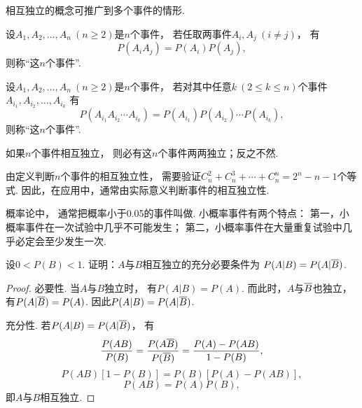 相互独立的概念可推广到多个事件的情形.
\begin{definition}
设\(A_1,A_2,\dotsc,A_n\ (n \geq 2)\)是\(n\)个事件，
若任取两事件\(A_i,A_j\ (i \neq j)\)，
有\begin{equation*}
	P(A_i A_j) = P(A_i) P(A_j),
\end{equation*}
则称“这\(n\)个事件”.
\end{definition}

\begin{definition}
设\(A_1,A_2,\dotsc,A_n\ (n \geq 2)\)是\(n\)个事件，
若对其中任意\(k\ (2 \leq k \leq n)\)个事件\(A_{i_1},A_{i_2},\dotsc,A_{i_k}\)
有\begin{equation*}
	P(A_{i_1} A_{i_2} \dotsm A_{i_k})
	= P(A_{i_1}) P(A_{i_2}) \dotsm P(A_{i_k}),
\end{equation*}
则称“这\(n\)个事件”.
\end{definition}

\begin{theorem}
如果\(n\)个事件相互独立，
则必有这\(n\)个事件两两独立；反之不然.
\end{theorem}

由定义判断\(n\)个事件的相互独立性，
需要验证\(C_n^2+C_n^3+\dotsb+C_n^n=2^n-n-1\)个等式.
因此，在应用中，通常由实际意义判断事件的相互独立性.

概率论中，
通常把概率小于0.05的事件叫做.
小概率事件有两个特点：
第一，小概率事件在一次试验中几乎不可能发生；
第二，小概率事件在大量重复试验中几乎必定会至少发生一次.

\begin{example}
设\(0<P(B)<1\).
证明：\(A\)与\(B\)相互独立的充分必要条件为
\(P(A \vert B) = P(A \vert \SetComplementaryL{B})\).
\begin{proof}
必要性.
当\(A\)与\(B\)独立时，
有\(P(A \vert B) = P(A)\).
而此时，\(A\)与\(\SetComplementaryL{B}\)也独立，
有\(P(A \vert \SetComplementaryL{B}) = P(A)\).
因此\(P(A \vert B) = P(A \vert \SetComplementaryL{B})\).

充分性.
若\(P(A \vert B) = P(A \vert \SetComplementaryL{B})\)，
有\begin{equation*}
	\frac{P(AB)}{P(B)}
	= \frac{P(A\SetComplementaryL{B})}{P(\SetComplementaryL{B})}
	= \frac{P(A)-P(AB)}{1-P(B)},
\end{equation*}\begin{equation*}
	P(AB) [1-P(B)] = P(B) [P(A)-P(AB)],
\end{equation*}\begin{equation*}
	P(AB) = P(A) P(B),
\end{equation*}
即\(A\)与\(B\)相互独立.
\end{proof}
\end{example}

